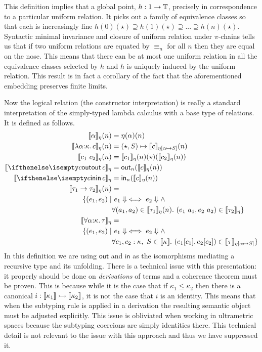 This definition implies that a global point, $h : 1 \to \mathbb{T}$,
precisely in correspondence to a particular uniform relation. It picks
out a family of equivalence classes so that each is increasingly fine
$h(0)(\star) \supseteq h(1)(\star) \supseteq ... \supseteq h(n)(\star)$.
Syntactic minimal invariance and closure of uniform relation under $\pi$-chains
tells us that if two uniform relations are equated by $\equiv_n$ for
all $n$ then they are equal on the nose. This means that there can be
at most one uniform relation in all the equivalence classes selected
by $h$ and $h$ is uniquely induced by the uniform relation. This
result is in fact a corollary of the fact that the aforementioned
embedding preserves finite limits.

Now the logical relation (the constructor interpretation) is really a
standard interpretation of the simply-typed lambda calculus with a
base type of relations. It is defined as follows.
{\allowdisplaybreaks
\begin{align*}
  \den{\alpha}_\eta(n) &= \eta(\alpha)(n)\\
  \den{\lam{\alpha}{\kappa}{c}}_\eta(n) &= (\star, S) \mapsto \den{c}_{\eta[\alpha \mapsto S]}(n)\\
  \den{\ap{c_1}{c_2}}_\eta(n) &= \den{c_1}_\eta(n)(\star)(\den{c_2}_\eta(n))\\
  \den{\out{c}}_\eta &= \mathsf{out}_n(\den{c}_\eta(n))\\
  \den{\into{c}}_\eta &= \mathsf{in}_n(\den{c}_\eta(n))\\
  \den{\fn{\tau_1}{\tau_2}}_\eta(n) &=\\
  \{(e_1, e_2) \mid&\ e_1 \Downarrow \iff {e_2 \Downarrow} \AND \\
  & \forall (a_1, a_2) \in \den{\tau_1}_\eta(n). \ (\ap{e_1}{a_1}, \ap{e_2}{a_2}) \in \den{\tau_2}_\eta\}\\
  \den{\all{\alpha}{\kappa}{\tau}}_\eta &=\\
  \{(e_1, e_2) \mid&\ e_1 \Downarrow \iff {e_2 \Downarrow} \AND\\
  &\forall c_1, c_2 : \kappa,\ S \in \den{\kappa}.
    \ (\Ap{e_1}{c_1}, \Ap{e_2}{c_2}) \in \den{\tau}_{\eta[\alpha \mapsto S]}\}
\end{align*}
}
In this definition we are using $\mathsf{out}$ and $\mathsf{in}$ as
the isomorphisms mediating a recursive type and its unfolding. There
is a technical issue with this presentation: it properly should be
done on \emph{derivations} of terms and a coherence theorem must be
proven. This is because while it is the case that if
$\kappa_1 \le \kappa_2$ then there is a canonical
$i : \llbracket \kappa_1 \rrbracket \rightarrowtail \llbracket \kappa_2 \rrbracket$, it is not the case that $i$
is an identity. This means that when the subtyping rule is applied in
a derivation the resulting semantic object must be adjusted
explicitly. This issue is obliviated when working in ultrametric
spaces because the subtyping coercions are simply identities
there. This technical detail is not relevant to the issue with this
approach and thus we have suppressed it.

